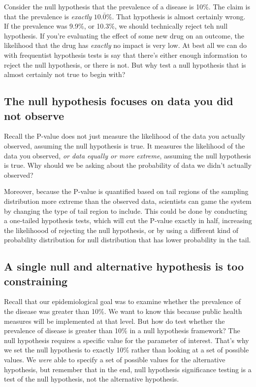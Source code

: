 \documentclass[
]{book}
\begin{document}
Consider the null hypothesis that the prevalence of a disease is 10\%. The claim is that the prevalence is \emph{exactly} \(10.\bar{0}\%\). That hypothesis is almost certainly wrong. If the prevalence was 9.9\%, or 10.3\%, we should technically reject teh null hypothesis. If you're evaluating the effect of some new drug on an outcome, the likelihood that the drug has \emph{exactly} no impact is very low. At best all we can do with frequentist hypothesis tests is say that there's either enough information to reject the null hypothesis, or there is not. But why test a null hypothesis that is almost certainly not true to begin with?

\subsection{The null hypothesis focuses on data you did not observe}\label{the-null-hypothesis-focuses-on-data-you-did-not-observe}

Recall the P-value does not just measure the likelihood of the data you actually observed, assuming the null hypothesis is true. It measures the likelihood of the data you observed, \emph{or data equally or more extreme}, assuming the null hypothesis is true. Why should we be asking about the probability of data we didn't actually observed?

Moreover, because the P-value is quantified based on tail regions of the sampling distribution more extreme than the observed data, scientists can game the system by changing the type of tail region to include. This could be done by conducting a one-tailed hypothesis tests, which will cut the P-value exactly in half, increasing the likelihoood of rejecting the null hypothesis, or by using a different kind of probability distribution for null distribution that has lower probability in the tail.

\subsection{A single null and alternative hypothesis is too constraining}\label{a-single-null-and-alternative-hypothesis-is-too-constraining}

Recall that our epidemiological goal was to examine whether the prevalence of the disease was greater than 10\%. We want to know this because public health measures will be implemented at that level. But how do test whether the prevalence of disease is greater than 10\% in a null hypothesis framework? The null hypothesis requires a specific value for the parameter of interest. That's why we set the null hypothesis to exactly 10\% rather than looking at a set of possible values. We \emph{were} able to specify a set of possible values for the alternative hypothesis, but remember that in the end, null hypothesis significance testing is a test of the null hypothesis, not the alternative hypothesis.
\end{document}
